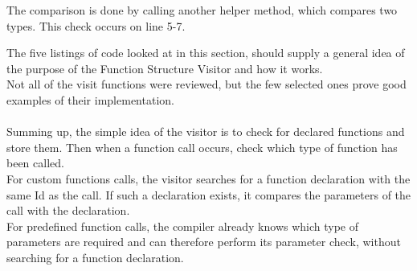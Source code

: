 The comparison is done by calling another helper method, which compares two types. This check occurs on line 5-7.

\noindent\newline
The five listings of code looked at in this section, should supply a general idea of the purpose of the Function Structure Visitor and how it works.\\
Not all of the visit functions were reviewed, but the few selected ones prove good examples of their implementation.
\\\\
Summing up, the simple idea of the visitor is to check for declared functions and store them. Then when a function call occurs, check which type of function has been called.\\
For custom functions calls, the visitor searches for a function declaration with the same Id as the call. If such a declaration exists, it compares the parameters of the call with the declaration.\\
For predefined function calls, the compiler already knows which type of parameters are required and can therefore perform its parameter check, without searching for a function declaration.
